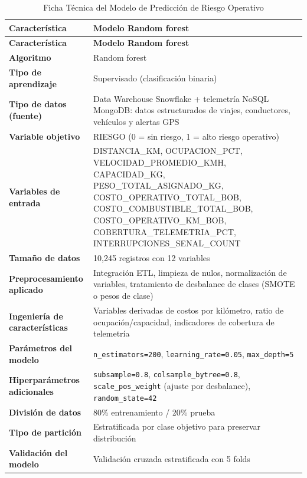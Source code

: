 \documentclass[12pt]{article}
\begin{document}
\begin{longtable}{>{\bfseries\color{white}\columncolor{headerblue}}p{5.5cm} p{9cm}}
\caption{Ficha Técnica del Modelo de Predicción de Riesgo Operativo} \\
\rowcolor{headerblue}
\textbf{\color{white}Característica} & \textbf{\color{white}Modelo Random forest } \\
\endfirsthead
\rowcolor{headerblue}
\textbf{\color{white}Característica} & \textbf{\color{white}Modelo Random forest} \\
\endhead
\rowcolor{rowgray}
Algoritmo & Random forest \\
Tipo de aprendizaje & Supervisado (clasificación binaria) \\
\rowcolor{rowgray}
Tipo de datos (fuente) & Data Warehouse Snowflake + telemetría NoSQL MongoDB: datos estructurados de viajes, conductores, vehículos y alertas GPS \\
Variable objetivo & RIESGO (0 = sin riesgo, 1 = alto riesgo operativo) \\
\rowcolor{rowgray}
Variables de entrada & DISTANCIA\_KM, OCUPACION\_PCT, VELOCIDAD\_PROMEDIO\_KMH, CAPACIDAD\_KG, PESO\_TOTAL\_ASIGNADO\_KG, COSTO\_OPERATIVO\_TOTAL\_BOB, COSTO\_COMBUSTIBLE\_TOTAL\_BOB, COSTO\_OPERATIVO\_KM\_BOB, COBERTURA\_TELEMETRIA\_PCT, INTERRUPCIONES\_SENAL\_COUNT \\
Tamaño de datos & 10,245 registros con 12 variables \\
\rowcolor{rowgray}
Preprocesamiento aplicado & Integración ETL, limpieza de nulos, normalización de variables, tratamiento de desbalance de clases (SMOTE o pesos de clase) \\
Ingeniería de características & Variables derivadas de costos por kilómetro, ratio de ocupación/capacidad, indicadores de cobertura de telemetría \\
\rowcolor{rowgray}
Parámetros del modelo & \texttt{n\_estimators=200}, \texttt{learning\_rate=0.05}, \texttt{max\_depth=5} \\
Hiperparámetros adicionales & \texttt{subsample=0.8}, \texttt{colsample\_bytree=0.8}, \texttt{scale\_pos\_weight} (ajuste por desbalance), \texttt{random\_state=42} \\
\rowcolor{rowgray}
División de datos & 80\% entrenamiento / 20\% prueba \\
Tipo de partición & Estratificada por clase objetivo para preservar distribución \\
\rowcolor{rowgray}
Validación del modelo & Validación cruzada estratificada con 5 folds \\

\end{longtable}
\end{document}
